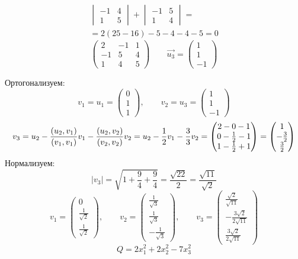 \begin{itemize}
\begin{multline*}
        \begin{vmatrix}
            -1 & 4 \\
            1 & 5
        \end{vmatrix} +
        \begin{vmatrix}
            -1 & 5 \\
            1 & 4
        \end{vmatrix} = \\
        = 2(25 - 16) - 5 - 4 - 4 - 5 = 0
    \end{multline*}
    $$
    \begin{pmatrix}
    	2 & -1 & 1 \\
        -1 & 5 & 4 \\
        1 & 4 & 5
    \end{pmatrix} \qquad \vec{u_3} =
    \begin{pmatrix}
    	1 \\
        1 \\
        -1
    \end{pmatrix} $$
\end{itemize}
Ортогонализуем:
$$ v_1 = u_1 =
\begin{pmatrix}
	0 \\
    1 \\
    1
\end{pmatrix}, \qquad v_2 = u_3 =
\begin{pmatrix}
	1 \\
    1 \\
    -1
\end{pmatrix} $$
$$ v_3 = u_2 - \frac{(u_2, v_1)}{(v_1, v_1)}v_1 - \frac{(u_2, v_2)}{(v_2, v_2)}v_2 = u_2 - \frac12v_1 - \frac33v_2 =
\begin{pmatrix}
	2 - 0 - 1 \\
    0 - \frac{1}2 - 1 \\
    1 - \frac{1}2 + 1
\end{pmatrix} =
\begin{pmatrix}
	1 \\
    -\frac32 \\
    \frac32
\end{pmatrix} $$
Нормализуем:
$$ |v_3| = \sqrt{1 + \frac94 + \frac94} = \frac{\sqrt{22}}2 = \frac{\sqrt{11}}{\sqrt2} $$
$$ v_1 =
\begin{pmatrix}
	0 \\
    \frac1{\sqrt2} \\
    \frac1{\sqrt2}
\end{pmatrix}, \qquad v_2 =
\begin{pmatrix}
    \frac1{\sqrt3} \\
    \frac1{\sqrt3} \\
    -\frac1{\sqrt3}
\end{pmatrix}, \qquad v_3 =
\begin{pmatrix}
    \frac{\sqrt2}{\sqrt{11}} \\
    -\frac{3\sqrt2}{2\sqrt{11}} \\
    \frac{3\sqrt2}{2\sqrt{11}}
\end{pmatrix} $$
$$ Q = 2x_1^2 + 2x_2^2 - 7x_3^2 $$


